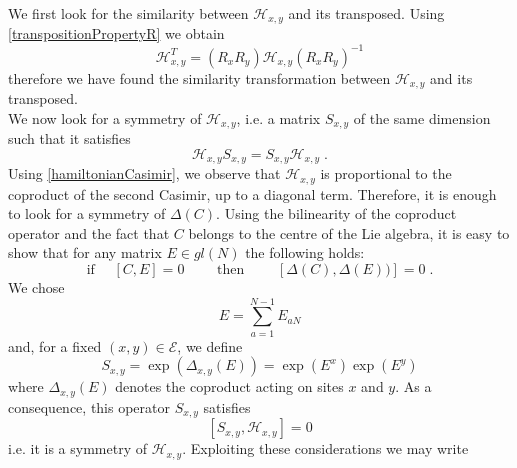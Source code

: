 \documentclass[10pt]{article}
\numberwithin{equation}{section}
\numberwithin{equation}{subsection}
\newcommand{\dt}{\;.}
\begin{document}
We first look for the similarity between $\mathcal{H}_{x,y}$ and its transposed. Using \eqref{transpositionPropertyR} we obtain  
\begin{equation}\label{transpositionPropertyH}
    \mathcal{H}_{x,y}^{T}=\left(R_{x}R_{y}\right)\mathcal{H}_{x,y}\left(R_{x}R_{y}\right)^{-1}
\end{equation}
therefore we have found the similarity transformation between $\mathcal{H}_{x,y}$ and its transposed. \\
We now look for a symmetry of $\mathcal{H}_{x,y}$, i.e. a matrix $S_{x,y}$ of the same dimension such that it satisfies 
\begin{equation}
	\mathcal{H}_{x,y}S_{x,y}=S_{x,y}\mathcal{H}_{x,y}
	\dt
\end{equation}
Using \eqref{hamiltonianCasimir}, we observe that $\mathcal{H}_{x,y}$ is proportional to the coproduct of the second Casimir, up to a diagonal term. Therefore, it is enough to look for a symmetry of $\Delta (C)$. Using the bilinearity of the coproduct operator and the fact that $C$ belongs to the centre of the Lie algebra, it is easy to show that for any matrix $E\in {gl}(N)$ the following holds:
\begin{equation}
 \text{if } \quad	[C,E]=0\qquad  \text{ then }\qquad \left[\Delta (C),\Delta(E)) \right]=0\dt
\end{equation}
We chose 
\begin{equation}
	E=\sum_{a=1}^{N-1}E_{aN}
\end{equation}
and, for a fixed $(x,y)\in \mathcal{E}$, we define
\begin{equation}
	S_{x,y}=\exp{(\Delta_{x,y}(E))}=\exp{(E^{x})}\exp{(E^{y})}
\end{equation}
where $\Delta_{x,y}(E)$ denotes the coproduct acting on sites $x$ and $y$. As a consequence, this operator $S_{x,y}$ satisfies
\begin{equation}\label{symmetryH}
	\left[S_{x,y},\mathcal{H}_{x,y}\right]=0
\end{equation}
i.e. it is a symmetry of $\mathcal{H}_{x,y}$. Exploiting these considerations we may write
\end{document}
